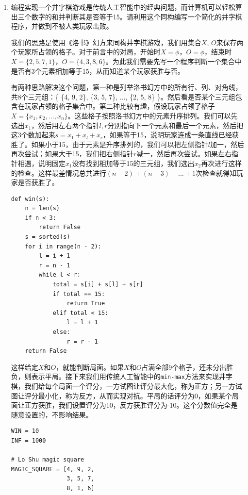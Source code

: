 \documentclass[UTF8]{article}
\begin{document}
\begin{enumerate}
\item 编程实现一个井字棋游戏是传统人工智能中的经典问题，而计算机可以轻松算出三个数字的和并判断其是否等于15。请利用这个同构编写一个简化的井字棋程序，并做到不被人类玩家击败。

我们的思路是使用《洛书》幻方来同构井字棋游戏，我们用集合$X$, $O$来保存两个玩家所占领的格子。对于前言中的对局，开始时$X = \phi$，$O = \phi$，结束时$X = \{ 2, 5, 7, 1 \}$，$O = \{ 4, 3, 8, 6 \}$。为此我们需要先写一个程序判断一个集合中是否有3个元素相加等于15，从而知道某个玩家获胜与否。

有两种思路解决这个问题，第一种是列举洛书幻方中的所有行、列、对角线，共8个三元组：\{ \{4, 9, 2\}, \{3, 5, 7\}, ..., \{2, 5, 8\} \}。然后看是否某个三元组包含在玩家占领的格子集合中。第二种比较有趣，假设玩家占领了格子$ X = \{x_1, x_2, ..., x_n\}$。这些格子按照洛书幻方中的元素升序排列。我们可以先选出$x_1$，然后用左右两个指针$l, r$分别指向下一个元素和最后一个元素，然后把这3个数加起来$s = x_1 + x_l + x_r$，如果等于15，说明玩家连成一条直线已经获胜了。如果小于15，由于元素是升序排列的，我们可以把左侧指针$l$加一，然后再次尝试；如果大于15，我们把右侧指针$r$减一，然后再次尝试。如果左右指针相遇，说明固定$x_1$没有找到相加等于15的三元组，我们选出$x_2$再次进行这样的检查。这样最差情况总共进行$(n - 2)+ (n - 3) + ... + 1$次检查就得知玩家是否获胜了。

\lstset{language=Python
    , frame=single
}
\begin{lstlisting}
def win(s):
    n = len(s)
    if n < 3:
        return False
    s = sorted(s)
    for i in range(n - 2):
        l = i + 1
        r = n - 1
        while l < r:
            total = s[i] + s[l] + s[r]
            if total == 15:
                return True
            elif total < 15:
                l = l + 1
            else:
                r = r - 1
    return False
\end{lstlisting}

这样给定$X$和$O$，就能判断局面。如果$X$和$O$占满全部9个格子，还未分出胜负，则表示平局。接下来我们用传统人工智能中的\texttt{min-max}方法来实现井字棋，我们给每个局面一个评分，一方试图让评分最大化，称为正方；另一方试图让评分最小化，称为反方，从而实现对抗。平局的话评分为0，如果某个局面让正方获胜，我们设置评分为10，反方获胜评分为-10。这个分数值完全是随意设置的，不影响结果。

\begin{lstlisting}
WIN = 10
INF = 1000

# Lo Shu magic square
MAGIC_SQUARE = [4, 9, 2,
                3, 5, 7,
                8, 1, 6]


\end{lstlisting}
\end{enumerate}
\end{document}
